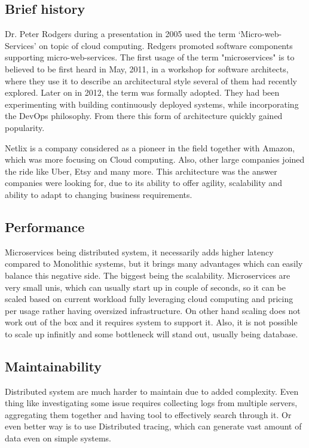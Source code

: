 

\subsection{Brief history}
Dr. Peter Rodgers during a presentation in 2005 used the term `Micro-web-Services' on topic of cloud computing. Redgers promoted software components supporting micro-web-services. The first usage of the term "microservices" is to believed to be first heard in May, 2011, in a workshop for software architects, where they use it to describe an architectural style several of them had recently explored. Later on in 2012, the term was formally adopted. They had been experimenting with building continuously deployed systems, while incorporating the DevOps philosophy. From there this form of architecture quickly gained popularity. \cite{BRIEF_HISTORY_OF_MS}

Netlix is a company considered as a pioneer in the field together with Amazon, which was more focusing on Cloud computing. Also, other large companies joined the ride like Uber, Etsy and many more. This architecture was the answer companies were looking for, due to its ability to offer agility, scalability and ability to adapt to changing business requirements. \cite{MS_COMPANIES}



\subsection{Performance}
Microservices being distributed system, it necessarily adds higher latency compared to Monolithic systems, but it brings many advantages which can easily balance this negative side. The biggest being the scalability. Microservices are very small unis, which can usually start up in couple of seconds, so it can be scaled based on current workload fully leveraging cloud computing and pricing per usage rather having oversized infrastructure. On other hand scaling does not work out of the box and it requires system to support it. Also, it is not possible to scale up infinitly and some bottleneck will stand out, usually being database.


\subsection{Maintainability}
Distributed system are much harder to maintain due to added complexity. Even thing like investigating some issue requires collecting logs from multiple servers, aggregating them together and having tool to effectively search through it. Or even better way is to use Distributed tracing, which can generate vast amount of data even on simple systems.

